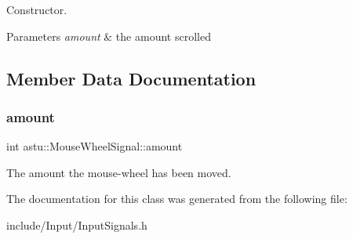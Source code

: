 Constructor.


\begin{DoxyParams}{Parameters}
{\em amount} & the amount scrolled \\
\hline
\end{DoxyParams}


\subsection{Member Data Documentation}
\mbox{\label{classastu_1_1MouseWheelSignal_ab53aabb0811ff39dced375ae5755806d}} 
\subsubsection{\texorpdfstring{amount}{amount}}
{\footnotesize\ttfamily int astu\+::\+Mouse\+Wheel\+Signal\+::amount}

The amount the mouse-\/wheel has been moved. 

The documentation for this class was generated from the following file\+:\begin{DoxyCompactItemize}
\item 
include/\+Input/Input\+Signals.\+h\end{DoxyCompactItemize}
